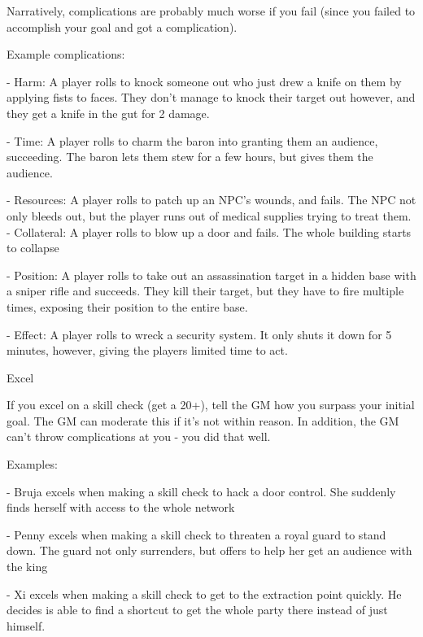 Narratively, complications are probably much worse if you fail (since you failed to accomplish
your goal and got a complication).


Example complications:

         	- Harm: A player rolls to knock someone out who just drew a knife on them by applying
         fists to faces. They don’t manage to knock their target out however, and they get a knife
         in the gut for 2 damage.

         - Time: A player rolls to charm the baron into granting them an audience, succeeding.
         The baron lets them stew for a few hours, but gives them the audience.

         	- Resources: A player rolls to patch up an NPC’s wounds, and fails. The NPC not only
         bleeds out, but the player runs out of medical supplies trying to treat them.
         - Collateral: A player rolls to blow up a door and fails. The whole building starts to
         collapse

         	- Position: A player rolls to take out an assassination target in a hidden base with a
         sniper rifle and succeeds. They kill their target, but they have to fire multiple times,
         exposing their position to the entire base.

         	- Effect: A player rolls to wreck a security system. It only shuts it down for 5 minutes,
         however, giving the players limited time to act.


                                                       Excel

If you excel on a skill check (get a 20+), tell the GM how you surpass your initial goal. The GM
can moderate this if it’s not within reason. In addition, the GM can’t throw complications at you -
you did that well.


Examples:

         	- Bruja excels when making a skill check to hack a door control. She suddenly finds
         herself with access to the whole network

         	- Penny excels when making a skill check to threaten a royal guard to stand down. The
         guard not only surrenders, but offers to help her get an audience with the king





         	- Xi excels when making a skill check to get to the extraction point quickly. He decides
         is able to find a shortcut to get the whole party there instead of just himself.

